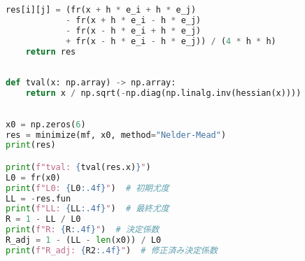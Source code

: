\begin{lstlisting}[language=Python]
            res[i][j] = (fr(x + h * e_i + h * e_j)
            - fr(x + h * e_i - h * e_j)
            - fr(x - h * e_i + h * e_j)
            + fr(x - h * e_i - h * e_j)) / (4 * h * h)
    return res
    
    
def tval(x: np.array) -> np.array:
    return x / np.sqrt(-np.diag(np.linalg.inv(hessian(x))))
    
    
x0 = np.zeros(6)
res = minimize(mf, x0, method="Nelder-Mead")
print(res)

print(f"tval: {tval(res.x)}")
L0 = fr(x0)
print(f"L0: {L0:.4f}")  # 初期尤度
LL = -res.fun
print(f"LL: {LL:.4f}")  # 最終尤度
R = 1 - LL / L0
print(f"R: {R:.4f}")  # 決定係数
R_adj = 1 - (LL - len(x0)) / L0
print(f"R_adj: {R2:.4f}")  # 修正済み決定係数
\end{lstlisting}
